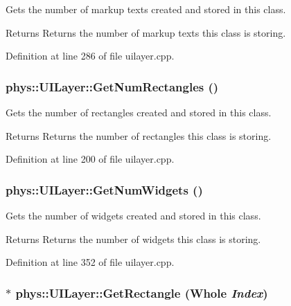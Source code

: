 Gets the number of markup texts created and stored in this class. 

\begin{DoxyReturn}{Returns}
Returns the number of markup texts this class is storing. 
\end{DoxyReturn}


Definition at line 286 of file uilayer.cpp.

\hypertarget{classphys_1_1UILayer_a42ad4ae8ba37db911270a3b1950b9814}{
\subsubsection[{GetNumRectangles}]{ phys::UILayer::GetNumRectangles ()}}
\label{da/d48/classphys_1_1UILayer_a42ad4ae8ba37db911270a3b1950b9814}


Gets the number of rectangles created and stored in this class. 

\begin{DoxyReturn}{Returns}
Returns the number of rectangles this class is storing. 
\end{DoxyReturn}


Definition at line 200 of file uilayer.cpp.

\hypertarget{classphys_1_1UILayer_aa745147022b7f78cdc5bccca57985459}{
\subsubsection[{GetNumWidgets}]{ phys::UILayer::GetNumWidgets ()}}
\label{da/d48/classphys_1_1UILayer_aa745147022b7f78cdc5bccca57985459}


Gets the number of widgets created and stored in this class. 

\begin{DoxyReturn}{Returns}
Returns the number of widgets this class is storing. 
\end{DoxyReturn}


Definition at line 352 of file uilayer.cpp.

\hypertarget{classphys_1_1UILayer_afb2b94ddabf0cce255dbd82d4e8a9312}{
\subsubsection[{GetRectangle}]{ $\ast$ phys::UILayer::GetRectangle ({\bf Whole} {\em Index})}}
\label{da/d48/classphys_1_1UILayer_afb2b94ddabf0cce255dbd82d4e8a9312}


